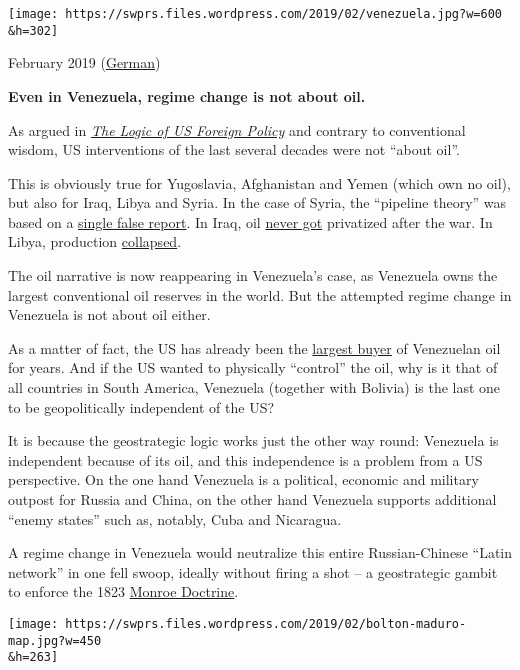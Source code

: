 \texttt{[image: https://swprs.files.wordpress.com/2019/02/venezuela.jpg?w=600\\\&h=302]}

February 2019 (\href{https://swprs.org/venezuela-erdoel/}{German})

\textbf{Even in Venezuela, regime change is not about oil.}

As argued in \href{https://swprs.org/us-foreign-policy/}{\emph{The Logic
of US Foreign Policy}} and contrary to conventional wisdom, US
interventions of the last several decades were not ``about oil''.

This is obviously true for Yugoslavia, Afghanistan and Yemen (which own
no oil), but also for Iraq, Libya and Syria. In the case of Syria, the
``pipeline theory'' was based on a
\href{https://truthout.org/articles/the-war-against-the-assad-regime-is-not-a-pipeline-war/}{single
false report}. In Iraq, oil
\href{https://theconversation.com/iraq-what-happened-to-the-oil-after-the-war-62188}{never
got} privatized after the war. In Libya, production
\href{http://www.businessinsider.com/r-how-unstable-is-libyas-oil-production-2018-3}{collapsed}.

The oil narrative is now reappearing in Venezuela's case, as Venezuela
owns the largest con­ven­tional oil reserves in the world. But the
attempted regime change in Venezuela is not about oil either.

As a matter of fact, the US has already been the
\href{https://www.eia.gov/todayinenergy/detail.php?id=9651}{largest
buyer} of Venezuelan oil for years. And if the US wanted to physically
``control'' the oil, why is it that of all countries in South America,
Venezuela (together with Bolivia) is the last one to be geopolitically
independent of the US?

It is because the geostrategic logic works just the other way round:
Venezuela is independent because of its oil, and this independence is a
problem from a US perspective. On the one hand Venezuela is a political,
economic and military outpost for Russia and China, on the other hand
Venezuela supports additional ``enemy states'' such as, notably, Cuba
and Nicaragua.

A regime change in Venezuela would neutralize this entire
Russian-Chinese ``Latin network'' in one fell swoop, ideally without
firing a shot -- a geostrategic gambit to enforce the 1823
\href{https://en.wikipedia.org/wiki/Monroe_Doctrine}{Monroe Doctrine}.

\texttt{[image: https://swprs.files.wordpress.com/2019/02/bolton-maduro-map.jpg?w=450\\\&h=263]}

